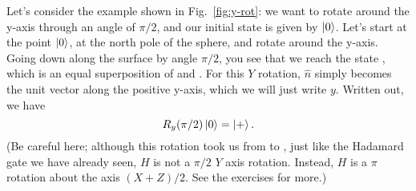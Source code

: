 Let's consider the example shown in Fig.~\ref{fig:y-rot}: we want to rotate around the y-axis through an angle of $\pi/2$, and our initial state is given by $\left| 0 \right\rangle$.  Let's start at the point $\left| 0 \right\rangle$, at the north pole of the sphere, and rotate around the y-axis. Going down along the surface by angle $\pi/2$, you see that we reach the state \ket{+}, which is an equal superposition of  and .  For this $Y$ rotation, $\hat{n}$ simply becomes the unit vector along the positive y-axis, which we will just write $y$. Written out, we have
\begin{equation}
R_y(\pi / 2)\left| 0 \right\rangle=\left| + \right\rangle.
\end{equation}
(Be careful here; although this rotation took us from  to \ket{+}, just like the Hadamard gate we have already seen, $H$ is not a $\pi/2$ $Y$ axis rotation.  Instead, $H$ is a $\pi$ rotation about the axis $(X+Z)/2$. See the exercises for more.)

